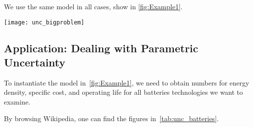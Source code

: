 We use the same model in all cases, show in \cref{fig:Example1}.
\begin{figure*}[b!]
    \centering
    \texttt{[image: unc\_bigproblem]}
    \caption{
        The semantics of the drone design exercises is the minimization of the  and  of the platform, subject to functionality constraints (, , ).
        We discuss how to introduce uncertainty in this framework, which allows, for example, to introduce parametric uncertainty in the definition of components properties (\eg  specific cost of batteries).
    }
    \label{fig:Example1}
\end{figure*}
\vfill\pagebreak
\subsection{Application: Dealing with Parametric Uncertainty\label{sec:Application-uncertainty}}

To instantiate the model in~\cref{fig:Example1}, we need to obtain numbers for energy density, specific cost, and operating life for all batteries technologies we want to examine.

By browsing Wikipedia, one can find the figures in~\cref{tab:unc_batteries}.


